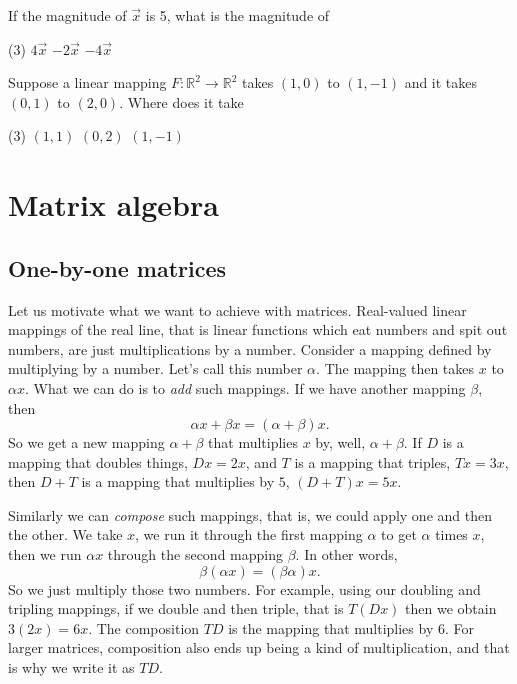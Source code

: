 \begin{exercise}
If the magnitude of $\vec{x}$ is 5, what is the magnitude of
\begin{tasks}(3)
\task
$4\vec{x}$
\task
$-2\vec{x}$
\task
$-4\vec{x}$
\end{tasks}
\end{exercise}

\begin{exercise}
Suppose a linear mapping $F \colon {\mathbb R}^2 \to {\mathbb R}^2$
takes $(1,0)$ to $(1,-1)$ and it takes $(0,1)$ to $(2,0)$. 
Where does it take
\begin{tasks}(3)
\task
$(1,1)$
\task
$(0,2)$
\task
$(1,-1)$
\end{tasks}
\end{exercise}


\sectionnewpage
\section{Matrix algebra}
\label{matalg:section}


\subsection{One-by-one matrices}

Let us motivate what we want to achieve with matrices.
Real-valued linear mappings of the real line, that is linear functions
which eat numbers and spit out numbers, are just multiplications by a
number.  Consider a mapping defined by multiplying by a
number.  Let's call this number $\alpha$.   The mapping then takes $x$ to
$\alpha x$.  What we can do is
to \emph{add} such mappings.
If we have another mapping $\beta$, then
\begin{equation*}
\alpha x + \beta x = (\alpha + \beta) x .
\end{equation*}
So we get a new mapping $\alpha+\beta$ that multiplies $x$ by, well,
$\alpha+\beta$.  If $D$ is a mapping that doubles things, 
$Dx = 2x$, and $T$ is a mapping that triples, $Tx = 3x$, then
$D+T$ is a mapping that multiplies by $5$, $(D+T)x = 5x$.

Similarly we can \emph{compose} such mappings, that
is, we could apply one and then the other.  We take $x$, we run it through
the first mapping $\alpha$ to get $\alpha$ times $x$, then we run
$\alpha x$ through the second mapping $\beta$.  In other words,
\begin{equation*}
\beta ( \alpha x ) = (\beta \alpha) x .
\end{equation*}
So we just multiply those two numbers.  For example, using our doubling
and tripling mappings, if we double and then triple, that is $T(Dx)$ then
we obtain $3(2x) = 6x$.  The composition $TD$ is the mapping that multiplies
by $6$.  For larger matrices, composition also ends up being a kind of
multiplication, and that is why we write it as $TD$.

